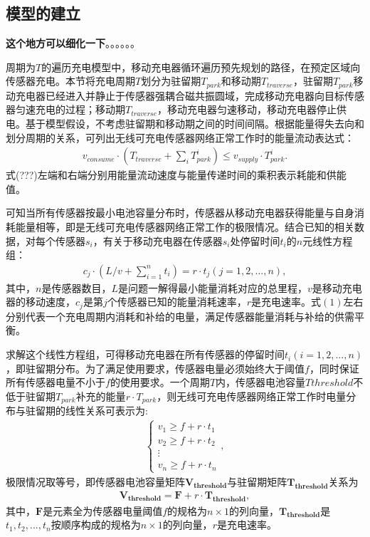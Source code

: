 \documentclass{whutmod}
\begin{document}
		\subsection{模型的建立}
			\textbf{这个地方可以细化一下}。。。。。。
			
			周期为$T$的遍历充电模型中，移动充电器循环遍历预先规划的路径，在预定区域向传感器充电。本节将充电周期$T$划分为驻留期$T_{park}$和移动期$T_{traverse}$，驻留期$T_{park}$移动充电器已经进入并静止于传感器强耦合磁共振圆域，完成移动充电器向目标传感器匀速充电的过程；移动期$T_{traverse}$，移动充电器匀速移动，移动充电器停止供电。基于模型假设，不考虑驻留期和移动期之间的时间间隔。根据能量得失去向和划分周期的关系，可列出无线可充电传感器网络正常工作时的能量流动表达式：
			\begin{gather}
			v_{consume}\cdot (T_{traverse}+\sum_{i} T_{park}^i)\leq v_{supply}\cdot T_{park}^i.
			\end{gather}
			式(???)左端和右端分别用能量流动速度与能量传递时间的乘积表示耗能和供能值。
			
			可知当所有传感器按最小电池容量分布时，传感器从移动充电器获得能量与自身消耗能量相等，即是无线可充电传感器网络正常工作的极限情况。结合已知的相关数据，对每个传感器$s_i$，有关于移动充电器在传感器$s_i$处停留时间$t_i$的$n$元线性方程组：
			\begin{gather}
			c_{j} \cdot (L/v+\sum_{i=1}^{n}t_i)=r \cdot t_j (j=1,2,...,n),
			\end{gather}
			其中，$n$是传感器数目，$L$是问题一解得最小能量消耗对应的总里程，$v$是移动充电器的移动速度，$c_{j}$是第$j$个传感器已知的能量消耗速率，$r$是充电速率。式$(1)$左右分别代表一个充电周期内消耗和补给的电量，满足传感器能量消耗与补给的供需平衡。
			
			求解这个线性方程组，可得移动充电器在所有传感器的停留时间$t_i(i=1,2,...,n)$，即驻留期分布。为了满足使用要求，传感器电量必须始终大于阈值$f$，同时保证所有传感器电量不小于$f$的使用要求。一个周期$T$内，传感器电池容量$T{threshold}$不低于驻留期$T_{park}$补充的能量$r \cdot T_{park}$，则无线可充电传感器网络正常工作时电量分布与驻留期的线性关系可表示为:
			\begin{gather}
			\left\{\begin{matrix}
			v_1\geq f+r\cdot t_1\\ 
			v_2\geq f+r\cdot t_2\\ 
			\vdots \\ 
			v_n \geq f+r\cdot t_n
			\end{matrix}\right.,
			\end{gather}
			极限情况取等号，即传感器电池容量矩阵$\bm {V_{threshold}}$与驻留期矩阵$\bm {T_{threshold}}$关系为
			\begin{gather}
			\bm{V_{threshold}}=\bm{F}+r\cdot \bm{T_{threshold}},
			\end{gather}
			其中，$\bm F$是元素全为传感器电量阈值$f$的规格为$n \times 1$的列向量，$\bm{T_{threshold}}$是$t_1,t_2,...,t_{n}$按顺序构成的规格为$n\times 1$的列向量，$r$是充电速率。
    		
\end{document}
